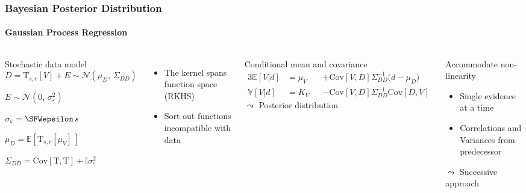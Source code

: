 \documentclass[aspectratio=169, t, 10pt]{beamer}
\newcommand\Mean[1]{\mathbb{E}\!\left[#1\right]}
\newcommand\Var[1]{\mathbb{V}\!\left[#1\right]}
\newcommand\Cov[2]{\mathrm{Cov}\!\left[#1,#2\right]}
\newcommand\Gauss[2]{\mathcal{N}\!\left({#1},\,{#2}\right)}
\newcommand{\Identity}{\mathbb{I}}
\begin{document}
\begin{frame}
    \frametitle{Bayesian Posterior Distribution}
    \framesubtitle{Gaussian Process Regression}

\begin{columns}

    \begin{block}{Stochastic data model}
        \begin{equation}
            D = \mathrm T_{s,r}[V] + E \sim \Gauss{\mu_D}{\Sigma_{DD}}
        \end{equation}
        \begin{description}[labelwidth=25mm]
            \item [Error model]        $E\sim \Gauss{0}{\sigma_\varepsilon^2}$
            \item [Uncertainty]        $\sigma_\varepsilon = \SFWepsilon\,s$
            \item [Prior travel times] $\mu_D = \Mean{\mathrm T_{s,r}[\mu_V]\,}$
            \item [Covariance matrix]  $\Sigma_{DD} = \Cov{\mathrm T}{\mathrm T}  + \Identity \sigma_\varepsilon^2$
        \end{description}
    \end{block}

    \begin{itemize}
        \item The kernel spans function space (RKHS)
        \item Sort out functions incompatible with data
    \end{itemize}


    \begin{exampleblock}{Conditional mean and covariance}
        \setlength\abovedisplayskip{0pt}
        \begin{alignat}{3}
            \Mean{V|d} &= \mu_V &&+ \Cov VD \Sigma_{DD}^{-1} \big( d - \mu_{D} \big)
            \\
            \Var{V|d}  &= K_V   &&- \Cov VD \Sigma_{DD}^{-1} \Cov DV
        \end{alignat}
        \hfill {\Large $\leadsto$} Posterior distribution \phantom{p}
    \end{exampleblock}

    \begin{alertblock}{Accommodate non-linearity}
        \begin{itemize}
            \item Single evidence at a time
            \item Correlations and Variances from predecessor
        \end{itemize}
        \hfill {\Large $\leadsto$} Successive approach ~
    \end{alertblock}

\end{columns}

\end{frame}
\end{document}
